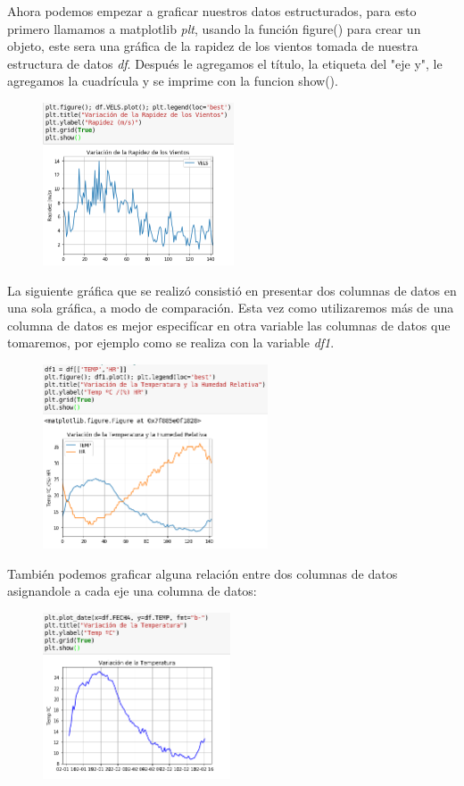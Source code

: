 \documentclass{article}
\begin{document}
Ahora podemos empezar a graficar nuestros datos estructurados, para esto primero llamamos a matplotlib \textit{plt}, usando la función figure() para crear un objeto, este sera una gráfica de la rapidez de los vientos tomada de nuestra estructura de datos \textit{df}. Después le agregamos el título, la etiqueta del "eje y", le agregamos la cuadrícula y se imprime con la funcion show().
\begin{figure}[h]
\centering
\includegraphics[height=182px,width=214px]{12thcell.png}
\end{figure}

La siguiente gráfica que se realizó consistió en presentar dos columnas de datos en una sola gráfica, a modo de comparación. Esta vez como utilizaremos más de una columna de datos es mejor especifícar en otra variable las columnas de datos que tomaremos, por ejemplo como se realiza con la variable \textit{df1}.
\begin{figure}[ht]
\centering
\includegraphics[height=206px,width=252px]{13thcell.png}
\end{figure}

También podemos graficar alguna relación entre dos columnas de datos asignandole a cada eje una columna de datos:
\begin{figure}[!ht]
\centering
\includegraphics[height=187px,width=210px]{14thcell.png}
\end{figure}
\end{document}
